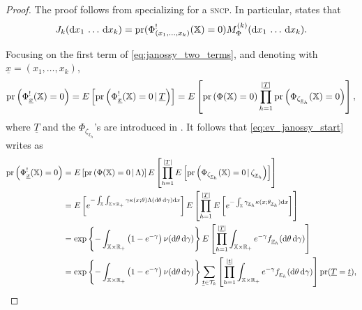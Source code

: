 \documentclass[11pt,a4paper,oneside]{article}
\newcommand{\calT}{\mathcal{T}}
\newcommand{\dd}{\mathrm d}
\newcommand{\E}{E}
\newcommand{\X}{\mathbb{X}}
\newcommand{\R}{\mathbb{R}}
\newcommand{\prob}{{\rm pr}}
\renewcommand{\mid}{\ensuremath{\,|\,}}
\theoremstyle{definition}
\theoremstyle{remark}
\begin{document}
\begin{proof}
The proof follows from specializing  for a \textsc{sncp}. In particular,  states that
\begin{equation}\label{eq:janossy_two_terms}
    J_k(\dd x_1\,\ldots\, \dd x_k) = \prob(\Phi^!_{(x_1,\ldots,x_k)}(\X) = 0)  M^{(k)}_{\Phi}(\dd x_1\,\ldots\, \dd x_k).
\end{equation}

Focusing on the first term of \eqref{eq:janossy_two_terms}, and denoting with $\underline{x} = (x_1,\ldots,x_k)$,
\begin{equation}\label{eq:ev_janossy_start}
        \prob \left( \Phi^!_{\underline{x}}(\X) = 0 \right) = \E \left[ \prob \left( \Phi^!_{\underline{x}}(\X) = 0 \mid \underline{T} \right) \right] = \E \left[ \prob \left( \Phi(\X) = 0 \right) \prod_{h=1}^{|\underline{T}|} \prob \left( \Phi_{\zeta_{\underline{x}_h}}(\X) = 0 \right)  \right], 
\end{equation}
where $\underline{T}$ and the $\Phi_{\zeta_{\underline{x}_h}}$'s are introduced in . It follows that \eqref{eq:ev_janossy_start} writes as
\begin{equation*}
   \begin{aligned}
       \prob \left( \Phi^!_{\underline{x}}(\X) = 0 \right) &= \E\left[ \prob \left( \Phi(\X) = 0 \mid \Lambda \right)\right] \E \left[ \prod_{h=1}^{|\underline{T}|} \E\left[ \prob \left( \Phi_{\zeta_{\underline{x}_h}}(\X) = 0 \mid \zeta_{\underline{x}_h}\right)\right]  \right]\\
       &= \E\left[ e^{- \int_{\X} \int_{\X\times\R_+} \gamma \kappa(x; \theta) \Lambda(\dd \theta\, \dd \gamma) \dd x} \right] \E\left[ \prod_{h=1}^{|\underline{T}|} \E\left[ e^{- \int_{\X} \gamma_{\underline{x}_h} \kappa(x; \theta_{\underline{x}_h}) \dd x} \right] \right]\\
       &= \exp\left\{ - \int_{\X\times\R_+} \left(1 - e^{- \gamma } \right) \nu(\dd \theta \, \dd \gamma) \right\} \E\left[ \prod_{h=1}^{|\underline{T}|} \int_{\X\times\R_+} e^{-\gamma } f_{\underline{x}_h}(\dd\theta \, \dd \gamma) \right]\\
       &= \exp\left\{ - \int_{\X\times\R_+} \left(1 - e^{- \gamma  } \right) \nu(\dd \theta\, \dd \gamma) \right\} \sum_{\underline{t} \in \calT_k} \left[ \prod_{h=1}^{|\underline{t}|} \int_{\X\times\R_+} e^{-\gamma } f_{\underline{x}_h}(\dd\theta \, \dd \gamma) \right] \prob(\underline{T} = \underline{t}),
   \end{aligned} 

\end{equation*}
\end{proof}
\end{document}
